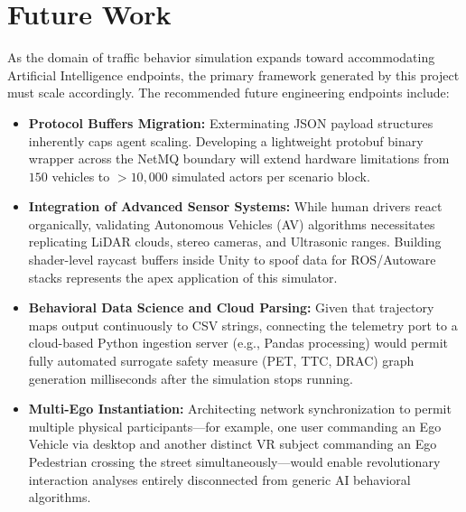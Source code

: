 \section{Future Work}

As the domain of traffic behavior simulation expands toward accommodating Artificial Intelligence endpoints, the primary framework generated by this project must scale accordingly. The recommended future engineering endpoints include:

\begin{itemize}[label={\color{AccentTeal}$\blacktriangleright$}, leftmargin=2em, itemsep=6pt]
    \item \textbf{Protocol Buffers Migration:} Exterminating JSON payload structures inherently caps agent scaling. Developing a lightweight protobuf binary wrapper across the NetMQ boundary will extend hardware limitations from $150$ vehicles to $>10,000$ simulated actors per scenario block.
    \item \textbf{Integration of Advanced Sensor Systems:} While human drivers react organically, validating Autonomous Vehicles (AV) algorithms necessitates replicating LiDAR clouds, stereo cameras, and Ultrasonic ranges. Building shader-level raycast buffers inside Unity to spoof data for ROS/Autoware stacks represents the apex application of this simulator.
    \item \textbf{Behavioral Data Science and Cloud Parsing:} Given that trajectory maps output continuously to CSV strings, connecting the telemetry port to a cloud-based Python ingestion server (e.g., Pandas processing) would permit fully automated surrogate safety measure (PET, TTC, DRAC) graph generation milliseconds after the simulation stops running.
    \item \textbf{Multi-Ego Instantiation:} Architecting network synchronization to permit multiple physical participants—for example, one user commanding an Ego Vehicle via desktop and another distinct VR subject commanding an Ego Pedestrian crossing the street simultaneously—would enable revolutionary interaction analyses entirely disconnected from generic AI behavioral algorithms.
\end{itemize}
